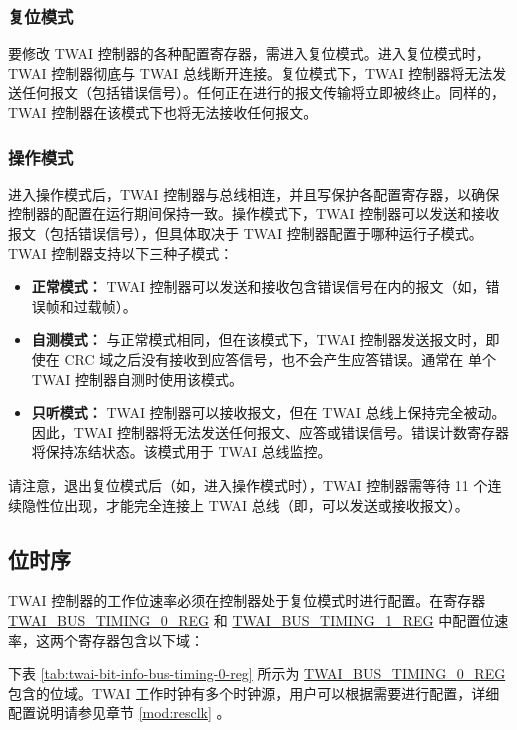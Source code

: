 \documentclass[main\_\_CN.tex]{subfiles}
\begin{document}
\subsubsection{复位模式}
要修改 TWAI 控制器的各种配置寄存器，需进入复位模式。进入复位模式时，TWAI 控制器彻底与 TWAI 总线断开连接。复位模式下，TWAI 控制器将无法发送任何报文（包括错误信号）。任何正在进行的报文传输将立即被终止。同样的，TWAI 控制器在该模式下也将无法接收任何报文。

\subsubsection{操作模式}
进入操作模式后，TWAI 控制器与总线相连，并且写保护各配置寄存器，以确保控制器的配置在运行期间保持一致。操作模式下，TWAI 控制器可以发送和接收报文（包括错误信号），但具体取决于 TWAI 控制器配置于哪种运行子模式。TWAI 控制器支持以下三种子模式：

\begin{itemize}
    \item {\bfseries 正常模式：} TWAI 控制器可以发送和接收包含错误信号在内的报文（如，错误帧和过载帧）。
    \item {\bfseries 自测模式：} 与正常模式相同，但在该模式下，TWAI 控制器发送报文时，即使在 CRC 域之后没有接收到应答信号，也不会产生应答错误。通常在 单个 TWAI 控制器自测时使用该模式。
    \item {\bfseries 只听模式：} TWAI 控制器可以接收报文，但在 TWAI 总线上保持完全被动。因此，TWAI 控制器将无法发送任何报文、应答或错误信号。错误计数寄存器将保持冻结状态。该模式用于 TWAI 总线监控。
\end{itemize}

请注意，退出复位模式后（如，进入操作模式时），TWAI 控制器需等待 11 个连续隐性位出现，才能完全连接上 TWAI 总线（即，可以发送或接收报文）。

\subsection{位时序}
TWAI 控制器的工作位速率必须在控制器处于复位模式时进行配置。在寄存器 \\\hyperref[regdesc:TWAIBUSTIMING0REG]{TWAI\_BUS\_TIMING\_0\_REG} 和 \hyperref[regdesc:TWAIBUSTIMING1REG]{TWAI\_BUS\_TIMING\_1\_REG} 中配置位速率，这两个寄存器包含以下域：

下表 \ref{tab:twai-bit-info-bus-timing-0-reg} 所示为 \hyperref[regdesc:TWAIBUSTIMING0REG]{TWAI\_BUS\_TIMING\_0\_REG} 包含的位域。TWAI 工作时钟有多个时钟源，用户可以根据需要进行配置，详细配置说明请参见章节 \ref{mod:resclk} \textit{}。
\end{document}
